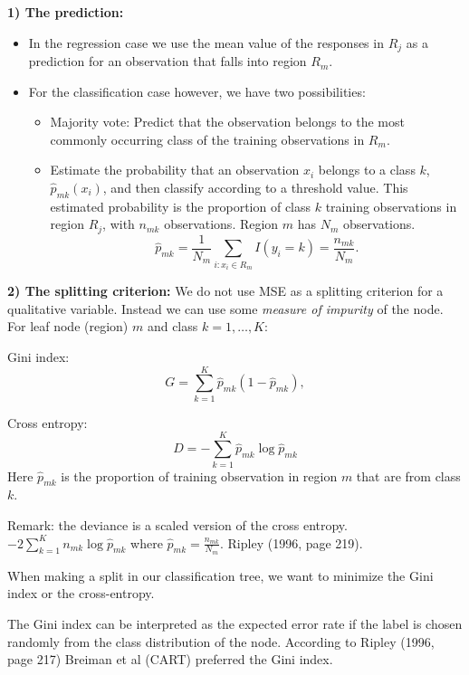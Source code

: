 \documentclass[
  ignorenonframetext,
]{beamer}
\providecommand{\tightlist}{%
  \setlength{\itemsep}{0pt}\setlength{\parskip}{0pt}}
\begin{document}
\begin{frame}

\textbf{1) The prediction:}

\begin{itemize}
\tightlist
\item
  In the regression case we use the mean value of the responses in
  \(R_j\) as a prediction for an observation that falls into region
  \(R_m\).
\item
  For the classification case however, we have two possibilities:

  \begin{itemize}
  \tightlist
  \item
    Majority vote: Predict that the observation belongs to the most
    commonly occurring class of the training observations in \(R_m\).\\
  \item
    Estimate the probability that an observation \(x_i\) belongs to a
    class \(k\), \(\hat{p}_{mk}(x_i)\), and then classify according to a
    threshold value. This estimated probability is the proportion of
    class \(k\) training observations in region \(R_j\), with \(n_{mk}\)
    observations. Region \(m\) has \(N_m\) observations.
    \[\hat{p}_{mk} = \frac{1}{N_m} \sum_{i:x_i \in R_m} I(y_i = k)=\frac{n_{mk}}{N_m}.\]
  \end{itemize}
\end{itemize}

\end{frame}

\begin{frame}

\textbf{2) The splitting criterion:} We do not use MSE as a splitting
criterion for a qualitative variable. Instead we can use some
\emph{measure of impurity} of the node. For leaf node (region) \(m\) and
class \(k=1,\ldots, K\):

Gini index: \[
G=\sum_{k=1}^K \hat{p}_{mk}(1-\hat{p}_{mk}),
\]

Cross entropy: \[
D=-\sum_{k=1}^K \hat{p}_{mk}\log\hat{p}_{mk}
\] Here \(\hat{p}_{mk}\) is the proportion of training observation in
region \(m\) that are from class \(k\).

Remark: the deviance is a scaled version of the cross entropy.
\(-2\sum_{k=1}^K n_{mk} \log\hat{p}_{mk}\) where
\(\hat{p}_{mk}=\frac{n_{mk}}{N_m}\). Ripley (1996, page 219).

When making a split in our classification tree, we want to minimize the
Gini index or the cross-entropy.

The Gini index can be interpreted as the expected error rate if the
label is chosen randomly from the class distribution of the node.
According to Ripley (1996, page 217) Breiman et al (CART) preferred the
Gini index.

\end{frame}
\end{document}
